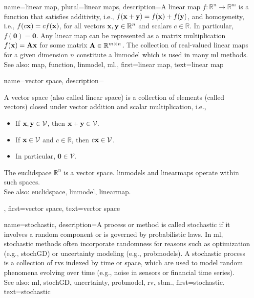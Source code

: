 {name={linear map}, plural={linear maps}, 
	description={A linear \gls{map} $f: \mathbb{R}^n \rightarrow \mathbb{R}^m$ is a \gls{function} that satisfies additivity, i.e.,
		$f({\bf x} + {\bf y}) = f({\bf x}) + f({\bf y})$, and homogeneity, i.e.,
		$f(c{\bf x}) = c f({\bf x})$, for all vectors ${\bf x}, {\bf y} \in \mathbb{R}^n$ and scalars $c \in \mathbb{R}$. 
		In particular, $f(\mathbf{0}) = \mathbf{0}$. Any linear \gls{map} can be represented as a matrix 
		multiplication $f({\bf x}) = {\bf A} {\bf x}$ for some matrix ${\bf A} \in \mathbb{R}^{m \times n}$. 
		The collection of real-valued linear \glspl{map} for a given dimension $n$ constitute a \gls{linmodel} 
		which is used in many \gls{ml} methods.\\
		See also: \gls{map}, \gls{function}, \gls{linmodel}, \gls{ml}.},
	first={linear map},
	text={linear map}
}


{name={vector space},
	description={A vector space (also called linear space) is a collection of elements (called vectors) closed under vector addition and scalar multiplication, i.e.,
		\begin{itemize}
			\item If ${\bf x}, {\bf y} \in \mathcal{V}$, then ${\bf x} + {\bf y} \in \mathcal{V}$.
			\item If ${\bf x} \in \mathcal{V}$ and $c \in \mathbb{R}$, then $c {\bf x} \in \mathcal{V}$.
			\item In particular, $\mathbf{0} \in \mathcal{V}$.
		\end{itemize}
		The \gls{euclidspace} $\mathbb{R}^n$ is a vector space.
		\Glspl{linmodel} and \glspl{linearmap} operate within such spaces.\\
		See also: \gls{euclidspace}, \gls{linmodel}, \gls{linearmap}.},
	first={vector space},
	text={vector space}
}


{name={stochastic},
	description={A process or method is called stochastic if it involves
		a random component or is governed by probabilistic laws. In \gls{ml}, stochastic
		methods often incorporate randomness for reasons such as optimization (e.g., \gls{stochGD})
		or \gls{uncertainty} modeling (e.g., \glspl{probmodel}). A stochastic process is a collection
		of \glspl{rv} indexed by time or space, which are used to model random phenomena
		evolving over time (e.g., noise in sensors or financial time series).\\
		See also:  \gls{ml}, \gls{stochGD}, \gls{uncertainty}, \gls{probmodel}, \gls{rv}, \gls{sbm}.},
	first={stochastic},
	text={stochastic}
}

